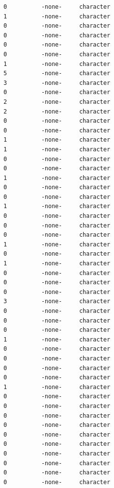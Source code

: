 \documentclass[
  letterpaper,
  DIV=11,
  numbers=noendperiod]{scrreprt}
\begin{document}
\begin{verbatim}
 0          -none-     character                  
 1          -none-     character                  
 0          -none-     character                  
 0          -none-     character                  
 0          -none-     character                  
 0          -none-     character                  
 1          -none-     character                  
 5          -none-     character                  
 3          -none-     character                  
 0          -none-     character                  
 2          -none-     character                  
 2          -none-     character                  
 0          -none-     character                  
 0          -none-     character                  
 1          -none-     character                  
 1          -none-     character                  
 0          -none-     character                  
 0          -none-     character                  
 1          -none-     character                  
 0          -none-     character                  
 0          -none-     character                  
 1          -none-     character                  
 0          -none-     character                  
 0          -none-     character                  
 0          -none-     character                  
 1          -none-     character                  
 0          -none-     character                  
 1          -none-     character                  
 0          -none-     character                  
 0          -none-     character                  
 0          -none-     character                  
 3          -none-     character                  
 0          -none-     character                  
 0          -none-     character                  
 0          -none-     character                  
 1          -none-     character                  
 0          -none-     character                  
 0          -none-     character                  
 0          -none-     character                  
 0          -none-     character                  
 1          -none-     character                  
 0          -none-     character                  
 0          -none-     character                  
 0          -none-     character                  
 0          -none-     character                  
 0          -none-     character                  
 0          -none-     character                  
 0          -none-     character                  
 0          -none-     character                  
 0          -none-     character                  
 0          -none-     character                  

\end{verbatim}
\end{document}
